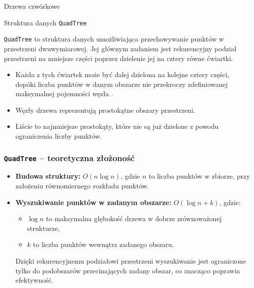 \documentclass[aspectratio=1610, polish]{beamer}
\begin{document}
\begin{section}{Drzewa czwórkowe }
    \begin{frame}{Struktura danych \texttt{QuadTree}}
        
        \texttt{QuadTree} to struktura danych umożliwiająca przechowywanie punktów w przestrzeni dwuwymiarowej.  
        Jej głównym zadaniem jest rekurencyjny podział przestrzeni na mniejsze części poprzez dzielenie jej na cztery równe ćwiartki. 
        \vspace{0.5cm}
        \pause
        \begin{itemize}
            \item Każda z tych ćwiartek może być dalej dzielona na kolejne cztery części, dopóki liczba punktów w danym obszarze nie przekroczy zdefiniowanej maksymalnej pojemności węzła .
            \pause
            \item Węzły drzewa reprezentują prostokątne obszary przestrzeni.
            \pause
            \item Liście to najmniejsze prostokąty, które nie są już dzielone z powodu ograniczenia liczby punktów.
        \end{itemize}

    \end{frame}


    \begin{frame}
        \frametitle{\texttt{QuadTree} -- teoretyczna złożoność}
            
        \begin{itemize}
            \item \textbf{Budowa struktury:}  
            \(O(n \log n)\), gdzie \(n\) to liczba punktów w zbiorze, przy założeniu równomiernego rozkładu punktów.
        \pause
        \vspace{0.5cm}
            \item \textbf{Wyszukiwanie punktów w zadanym obszarze:}  
        \(O(\log n + k)\), gdzie:
        \begin{itemize}
            \item \(\log n\) to maksymalna głębokość drzewa w dobrze zrównoważonej strukturze,
            \item \(k\) to liczba punktów wewnątrz zadanego obszaru.  
        \end{itemize}
        Dzięki rekurencyjnemu podziałowi przestrzeni wyszukiwanie jest ograniczone tylko do podobszarów przecinających zadany obszar, co znacząco poprawia efektywność.
        \end{itemize}
    

\end{frame}
\end{section}
\end{document}
